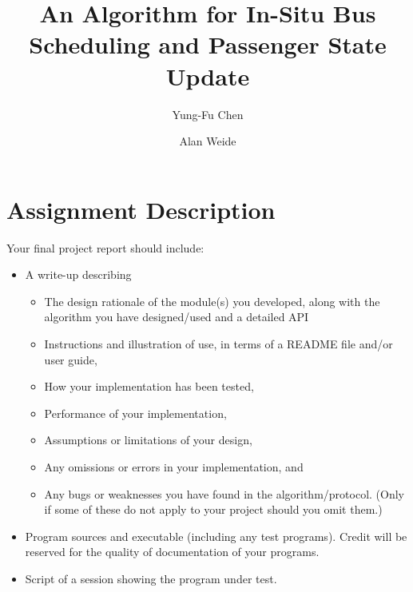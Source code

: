 \documentclass[runningheads]{llncs}
\begin{document}
\mainmatter  %

\title{An Algorithm for In-Situ Bus Scheduling and Passenger State Update}


%
%
\author{Yung-Fu Chen \and Alan Weide}



\maketitle

\renewcommand\thelstlisting{\arabic{lstlisting}}

\section{Assignment Description}
Your final project report should include:
\begin{itemize}
	\item A write-up describing
	\begin{itemize}
		\item The design rationale of the module(s) you developed, along with the algorithm you have designed/used and a detailed API
		\item Instructions and illustration of use, in terms of a README file and/or user guide,
		\item How your implementation has been tested,
		\item Performance of your implementation,
		\item Assumptions or limitations of your design,
		\item Any omissions or errors in your implementation, and
		\item Any bugs or weaknesses you have found in the algorithm/protocol. (Only if some of these do not apply to your project should you omit them.)
	\end{itemize}
	\item Program sources and executable (including any test programs). Credit will be reserved for the quality of documentation of your programs.
	\item Script of a session showing the program under test.
\end{itemize}
\end{document}
